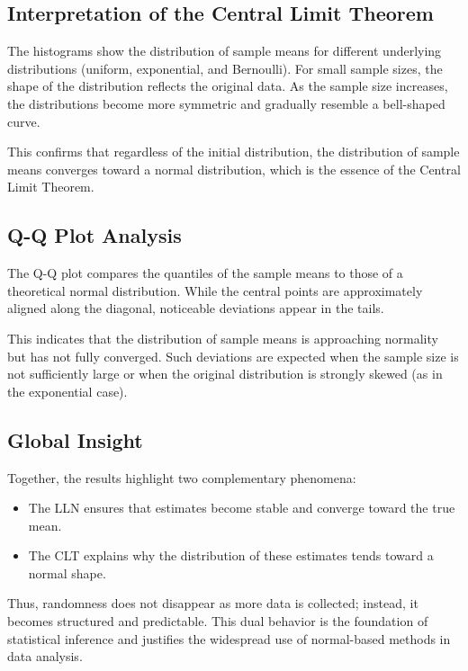 \documentclass[a4paper,12pt]{article}
\begin{document}
\subsection{Interpretation of the Central Limit Theorem}

The histograms show the distribution of sample means for different underlying distributions (uniform, exponential, and Bernoulli). For small sample sizes, the shape of the distribution reflects the original data. As the sample size increases, the distributions become more symmetric and gradually resemble a bell-shaped curve.

This confirms that regardless of the initial distribution, the distribution of sample means converges toward a normal distribution, which is the essence of the Central Limit Theorem.

\subsection{Q-Q Plot Analysis}

The Q-Q plot compares the quantiles of the sample means to those of a theoretical normal distribution. While the central points are approximately aligned along the diagonal, noticeable deviations appear in the tails.

This indicates that the distribution of sample means is approaching normality but has not fully converged. Such deviations are expected when the sample size is not sufficiently large or when the original distribution is strongly skewed (as in the exponential case).

\subsection{Global Insight}

Together, the results highlight two complementary phenomena:
\begin{itemize}
\item The LLN ensures that estimates become stable and converge toward the true mean.
\item The CLT explains why the distribution of these estimates tends toward a normal shape.
\end{itemize}

Thus, randomness does not disappear as more data is collected; instead, it becomes structured and predictable. This dual behavior is the foundation of statistical inference and justifies the widespread use of normal-based methods in data analysis.
\end{document}

